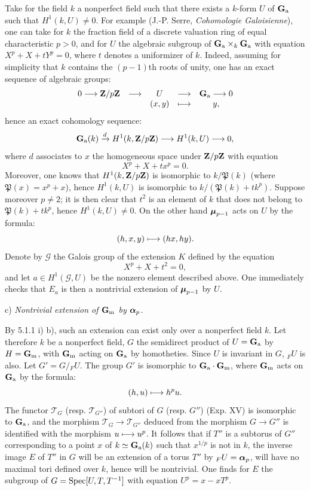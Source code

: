 Take for the field $k$ a nonperfect field such that there exists a $k$-form $U$ of $\mathbf{G}_{\mathrm{a}}$ such that $H^1(k,U)\ne0$. For example (\cf J.-P. Serre, \emph{Cohomologie Galoisienne}), one can take for $k$ the fraction field of a discrete valuation ring of equal characteristic $p>0$, and for $U$ the algebraic subgroup of $\mathbf{G}_{\mathrm{a}}\times_k\mathbf{G}_{\mathrm{a}}$ with equation $X^p+X+tY^p=0$, where $t$ denotes a uniformizer of $k$. Indeed, assuming for simplicity that $k$ contains the $(p-1)$th roots of unity, one has an exact sequence of algebraic groups:
\[
 \begin{array}{ccccc}
 0\longrightarrow\mathbf{Z}/p\mathbf{Z}&\longrightarrow&U&\longrightarrow&\mathbf{G}_{\mathrm{a}}\longrightarrow0\\
 &&(x,y)&\longmapsto&y,
 \end{array}
\]
hence an exact cohomology sequence:
\[
 \mathbf{G}_{\mathrm{a}}(k)\xrightarrow{d}H^1(k,\mathbf{Z}/p\mathbf{Z})\longrightarrow H^1(k,U)\longrightarrow0,
\]
where $d$ associates to $x$ the homogeneous space under $\mathbf{Z}/p\mathbf{Z}$ with equation
\[
 X^p+X+tx^p=0.
\]
Moreover, one knows that $H^1(k,\mathbf{Z}/p\mathbf{Z})$ is isomorphic to $k/\mathfrak P(k)$ (where $\mathfrak P(x)=x^p+x$), hence $H^1(k,U)$ is isomorphic to $k/(\mathfrak P(k)+tk^p)$. Suppose moreover $p\ne2$; it is then clear that $t^2$ is an element of $k$ that does not belong to $\mathfrak P(k)+tk^p$, hence $H^1(k,U)\ne0$.
On the other hand $\boldsymbol{\mu}_{p-1}$ acts on $U$ by the formula:
\[
 (h,x,y)\longmapsto(hx,hy).
\]
Denote by $\mathscr G$ the Galois group of the extension $K$ defined by the equation
\[
 X^p+X+t^2=0,
\]
and let $a\in H^1(\mathscr G,U)$ be the nonzero element described above. One immediately checks that $E_a$ is then a nontrivial extension of $\boldsymbol{\mu}_{p-1}$ by $U$.

\noindent c) \emph{Nontrivial extension of $\mathbf{G}_{\mathrm{m}}$ by $\boldsymbol{\alpha}_p$.}

By 5.1.1 i) b), such an extension can exist only over a nonperfect field $k$. Let therefore $k$ be a nonperfect field, $G$ the semidirect product of $U=\mathbf{G}_{\mathrm{a}}$ by $H=\mathbf{G}_{\mathrm{m}}$, with $\mathbf{G}_{\mathrm{m}}$ acting on $\mathbf{G}_{\mathrm{a}}$ by homotheties. Since $U$ is invariant in $G$, ${}_FU$ is also. Let $G'=G/{}_FU$. The group $G'$ is isomorphic to $\mathbf{G}_{\mathrm{a}}\cdot\mathbf{G}_{\mathrm{m}}$, where $\mathbf{G}_{\mathrm{m}}$ acts on $\mathbf{G}_{\mathrm{a}}$ by the formula:
\[
 (h,u)\longmapsto h^pu.
\]
The functor $\mathscr T_G$ (resp. $\mathscr T_{G''}$) of subtori of $G$ (resp. $G''$) (\cf Exp. XV) is isomorphic to $\mathbf{G}_{\mathrm{a}}$, and the morphism $\mathscr T_G\to\mathscr T_{G''}$ deduced from the morphism $G\to G''$ is identified with the morphism $u\longmapsto u^p$. It follows that if $T''$ is a subtorus of $G''$ corresponding to a point $x$ of $k\simeq\mathbf{G}_{\mathrm{a}}(k)$ such that $x^{1/p}$ is not in $k$, the inverse image $E$ of $T''$ in $G$ will be an extension of a torus $T''$ by ${}_FU=\boldsymbol{\alpha}_p$, will have no maximal tori defined over $k$, hence will be nontrivial. One finds for $E$ the subgroup of $G=\operatorname{Spec}[U,T,T^{-1}]$ with equation $U^p=x-xT^p$.

